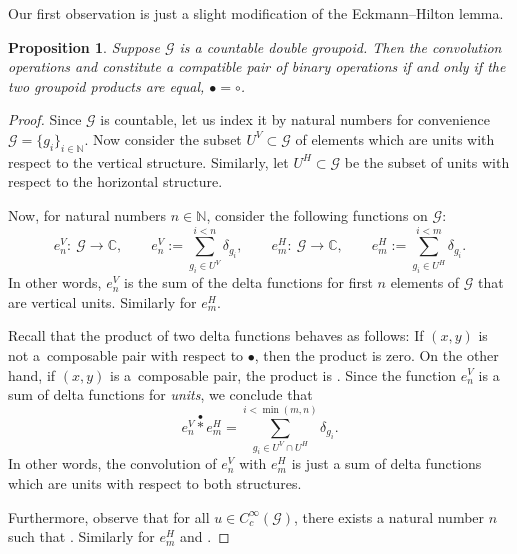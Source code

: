 \documentclass[pdftex]{sigma}
\numberwithin{equation}{section}
\newtheorem{Proposition}[Theorem]{Proposition}
\theoremstyle{definition}
\newcommand{\BBC}{\mathbb{C}}
\newcommand{\BBN}{\mathbb{N}}
\newcommand{\CG}{\mathcal{G}}
\newcommand{\stardot}{\overset{{\bullet}}{*}}
\newcommand{\starcirc}{\overset{\circ}{*}}
\begin{document}
Our first observation is just a slight modification of the Eckmann--Hilton lemma.
\begin{Proposition}
Suppose $ \CG $ is a countable double groupoid. Then the convolution operations \smash{$ \stardot $} and \smash{$ \starcirc $} constitute a compatible pair of binary operations if and only if the two groupoid products are equal, $ \bullet = \circ $.
\end{Proposition}
\begin{proof}
Since $ \CG $ is countable, let us index it by natural numbers for convenience
$\CG = \{ g_i \}_{i \in \BBN}$.
Now consider the subset $ U^V \subset \CG $ of elements which are units with respect to the vertical structure. Similarly, let $U^H \subset \CG $ be the subset of units with respect to the horizontal structure.

Now, for natural numbers $ n \in \BBN $, consider the following functions on $ \CG $:
\[
e_n^V \colon\ \CG \to \BBC, \qquad e_n^V := \sum\limits^{i<n}_{g_i \in U^V} \delta_{g_i},\qquad
e_m^H \colon\ \CG \to \BBC, \qquad e_m^H := \sum\limits^{i<m}_{g_i \in U^H} \delta_{g_i}.
\]
In other words, $ e^V_n $ is the sum of the delta functions for first $ n $ elements of $ \CG $ that are vertical units. Similarly for $ e^H_m$.

Recall that the product \smash{$ \delta_x \stardot \delta_y $} of two delta functions behaves as follows: If $ (x,y) $ is not a~composable pair with respect to $ \bullet $, then the product is zero. On the other hand, if $ (x,y) $ is a~composable pair, the product is \smash{$ \delta_x \stardot \delta_y = \delta_{x \bullet y} $}. Since the function $ e^V_n $ is a sum of delta functions for \emph{units}, we conclude that
\[
e^V_n \stardot e^H_m = \sum^{i < \min(m,n)}_{g_i \in U^V \cap U^H} \delta_{g_i}.
\]
In other words, the convolution of $ e^V_n $ with $ e^H_m$ is just a sum of delta functions which are units with respect to both structures.

Furthermore, observe that for all $ u \in C_c^\infty(\CG) $, there exists a natural number $ n $ such that
\smash{$e^V_n \starcirc u = u \starcirc e^V_n = u$}.
Similarly for $ e^H_m$ and \smash{$ \stardot $}.


\end{proof}
\end{document}
